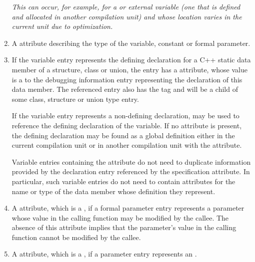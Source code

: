 \begin{enumerate}[1. ]
\textit{This can occur, for example, for a  
or  external variable (one that is defined 
and allocated in another compilation unit) and whose location 
varies in the current unit due to optimization.}
\db

\item A \DWATtype{} attribute describing the type of the variable,
constant or formal parameter.

\item If the variable entry represents the defining declaration
for a C++ static data member of a structure, class or union,
the entry has a \DWATspecification{} attribute, whose value is a
 to the debugging information 
entry representing the declaration of this data member. The referenced 
entry also has the tag \DWTAGvariable{} 
and will be a child of some class, structure or union type entry.

If the variable entry represents a
non-defining declaration, \DWATspecification{} may be used
to reference the defining declaration of the variable. If
no \DWATspecification{} attribute is present, the defining
declaration may be found as a global definition either in the
current compilation unit or in another compilation unit with
the \DWATexternal{} attribute.  

Variable entries containing
the \DWATspecification{} attribute do not need to duplicate
information provided by the declaration entry referenced by
the specification attribute. In particular, such variable
entries do not need to contain attributes for the name or
type of the data member whose definition they represent.

\item \hypertarget{chap:DWATvariableparameternonconstantparameterflag}{}
A \DWATvariableparameterDEFN{}
attribute, 
which is a ,
if a formal parameter entry represents a parameter whose
value in the calling function may be modified by the callee.
The absence of this attribute implies that the parameter\textquoteright s
value in the calling function cannot be modified by the callee.

\item \hypertarget{chap:DWATisoptionaloptionalparameter}{}
A \DWATisoptionalDEFN{} attribute, 
which is a , if a
parameter entry represents an .


\end{enumerate}
